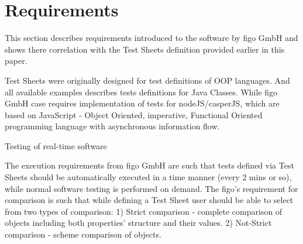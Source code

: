\chapter{Requirements}
\label{sec:reqiorements}
This section describes requirements introduced to the software by figo GmbH and shows there correlation with the Test Sheets definition provided earlier in this paper.



 
Test Sheets were originally designed for test definitions of OOP languages. And all available examples describes tests definitions for Java Classes. While figo GmbH case requires implementation of tests for nodeJS/casperJS, which are based on JavaScript - Object Oriented, imperative, Functional Oriented programming language with asynchronous information flow.

Testing of real-time software


The execution requirements from figo GmbH are such that tests defined via Test Sheets should be automatically executed in a time manner (every 2 mins or so), while normal software testing is performed on demand.
The figo's requirement for comparison is such that while defining a Test Sheet user should be able to select from two types of comparison: 1) Strict comparison - complete comparison of objects including both properties' structure and their values. 2) Not-Strict comparison - scheme comparison of objects.

